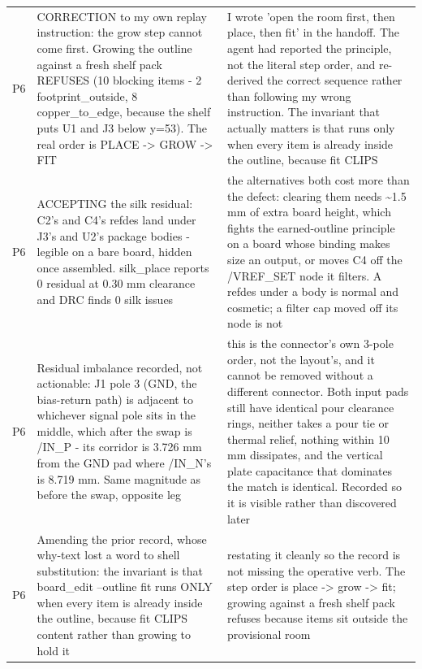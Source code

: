 \documentclass[11pt,a4paper]{article}
\begin{document}
{\begin{longtable}{lp{5.2cm}p{7.2cm}}
P6 & CORRECTION to my own replay instruction: the grow step cannot come first. Growing the outline against a fresh shelf pack REFUSES (10 blocking items - 2 footprint\_outside, 8 copper\_to\_edge, because the shelf puts U1 and J3 below y=53). The real order is PLACE -\textgreater{} GROW -\textgreater{} FIT & I wrote 'open the room first, then place, then fit' in the handoff. The agent had reported the principle, not the literal step order, and re-derived the correct sequence rather than following my wrong instruction. The invariant that actually matters is that  runs only when every item is already inside the outline, because fit CLIPS \\
P6 & ACCEPTING the silk residual: C2's and C4's refdes land under J3's and U2's package bodies - legible on a bare board, hidden once assembled. silk\_place reports 0 residual at 0.30 mm clearance and DRC finds 0 silk issues & the alternatives both cost more than the defect: clearing them needs \textasciitilde{}1.5 mm of extra board height, which fights the earned-outline principle on a board whose binding makes size an output, or moves C4 off the /VREF\_SET node it filters. A refdes under a body is normal and cosmetic; a filter cap moved off its node is not \\
P6 & Residual imbalance recorded, not actionable: J1 pole 3 (GND, the bias-return path) is adjacent to whichever signal pole sits in the middle, which after the swap is /IN\_P - its corridor is 3.726 mm from the GND pad where /IN\_N's is 8.719 mm. Same magnitude as before the swap, opposite leg & this is the connector's own 3-pole order, not the layout's, and it cannot be removed without a different connector. Both input pads still have identical pour clearance rings, neither takes a pour tie or thermal relief, nothing within 10 mm dissipates, and the vertical plate capacitance that dominates the match is identical. Recorded so it is visible rather than discovered later \\
P6 & Amending the prior record, whose why-text lost a word to shell substitution: the invariant is that board\_edit --outline fit runs ONLY when every item is already inside the outline, because fit CLIPS content rather than growing to hold it & restating it cleanly so the record is not missing the operative verb. The step order is place -\textgreater{} grow -\textgreater{} fit; growing against a fresh shelf pack refuses because items sit outside the provisional room \\

\end{longtable}}
\end{document}

